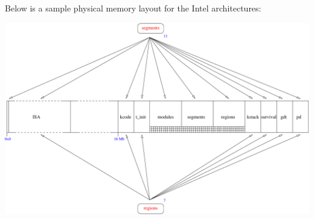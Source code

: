 Below is a sample physical memory layout for the Intel architectures:

\begin{center}
  \includegraphics[scale=0.7]{figures/k1-memory-layout.pdf}
\end{center}
